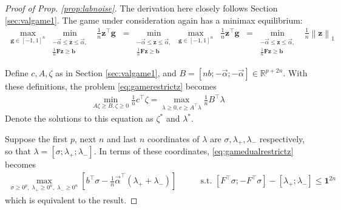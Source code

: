 \documentclass{colt2015} %
\newcommand{\vF}{\mathbf{F}}
\newcommand{\vb}{\mathbf{b}}
\newcommand{\vg}{\mathbf{g}}
\newcommand{\vz}{\mathbf{z}}
\newcommand{\valpha}{\vec{\alpha}}
\newcommand{\vnorm}[1]{\left\lVert#1\right\rVert} %
\newcommand{\ifn}{\mathbf{1}} %
\newcommand{\lrp}[1]{\left(#1\right)}
\begin{document}
\begin{proof}[Proof of Prop. \ref{prop:labnoise}]
The derivation here closely follows Section \ref{sec:valgame1}.
The game under consideration again has a minimax equilibrium: 
\begin{align}
\label{eq:gamerestrictz}
\max_{\vg \in [-1,1]^n} \min_{\substack{ - \valpha \leq \vz \leq \valpha , \\ \frac{1}{n} \vF \vz \geq \vb }} \;\; \frac{1}{n} \vz{^\top} \vg \;\;
= \min_{\substack{ - \valpha \leq \vz \leq \valpha , \\ \frac{1}{n} \vF \vz \geq \vb }} \max_{\vg \in [-1,1]^n} \;\; \frac{1}{n} \vz{^\top} \vg \;\;
= \min_{\substack{ - \valpha \leq \vz \leq \valpha , \\ \frac{1}{n} \vF \vz \geq \vb }} \;\; \frac{1}{n} \vnorm{\vz }_1
\end{align}

Define $c, A, \zeta$ as in Section \ref{sec:valgame1}, 
and $B = [n b; -\valpha; -\valpha] \in \mathbb{R}^{p + 2n}$. 
With these definitions, 
the problem \eqref{eq:gamerestrictz} becomes 
\begin{align}
\label{eq:gamedualrestrictz}
\min_{A \zeta \geq B , \zeta \geq 0} \frac{1}{n} c^\top \zeta 
= \max_{\lambda \geq 0, c \geq A^\top \lambda} \frac{1}{n} B^\top \lambda
\end{align}
Denote the solutions to this equation as $\zeta^*$ and $\lambda^*$. 

Suppose the first $p$, next $n$ and last $n$ coordinates of $\lambda$ are 
$\sigma, \lambda_{+}, \lambda_{-}$ respectively, 
so that $\lambda = [\sigma; \lambda_{+}; \lambda_{-} ]$.
In terms of these coordinates,
\eqref{eq:gamedualrestrictz} becomes 
\begin{align}
\label{mmxdualsdual}
\max_{\sigma \geq 0^p, \;\lambda_{+} \geq 0^{n}, \;\lambda_{-} \geq 0^{n}} 
\left[ b^\top \sigma - \frac{1}{n} \valpha^\top \lrp{ \lambda_{+} + \lambda_{-} } \right] \qquad &\mbox{s.t.  } 
[F^\top \sigma; - F^\top \sigma] - [\lambda_{+}; \lambda_{-}] \leq \ifn^{2n}
\end{align}
which is equivalent to the result.
\end{proof}

















\end{document}
